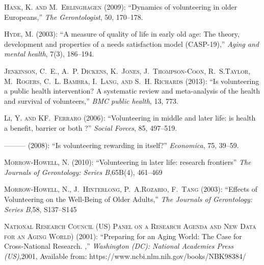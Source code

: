 \documentclass[10pt, letterpaper]{article}
\begin{document}
\begin{spacing}{1.4}
\begin{thebibliography}{87}
\textsc{Hank, K. and M.~Erlinghagen} (2009): \enquote{Dynamics of volunteering in older Europeans,} \emph{The Gerontologist}, 50, 170--178.  

\textsc{Hyde, M.} (2003): \enquote{A measure of quality of life in early old age: The theory, development and properties of a needs satisfaction model (CASP-19),} \emph{Aging and mental health}, 7(3), 186--194. 


\textsc{Jenkinson, C.~E., A.~P. Dickens, K.~Jones, J.~Thompson-Coon, R.~S.Taylor, M.~Rogers, C.~L. Bambra, I.~Lang, and S.~H. Richards} (2013):
  \enquote{Is volunteering a public health intervention? A systematic review and meta-analysis of the health and survival of volunteers,} \emph{BMC public health}, 13, 773.


\textsc{Li, Y. and KF.~Ferraro} (2006): \enquote{Volunteering in middle and later life: is health a benefit, barrier or both ?} \emph{Social Forces}, 85, 497--519. 


---\hspace{-.1pt}---\hspace{-.1pt}--- (2008{}): \enquote{Is volunteering rewarding in itself?} \emph{Economica}, 75, 39--59.

\textsc{Morrow-Howell, N.} (2010):
  \enquote{Volunteering in later life: research frontiers} \emph{The Journals of Gerontology: Series B},65B(4), 461–469


\textsc{Morrow-Howell, N., J.~Hinterlong, P.~A.Rozario, F.~Tang} (2003):
  \enquote{Effects of Volunteering on the Well-Being of Older Adults,} \emph{The Journals of Gerontology: Series B},58, S137--S145

\textsc{National Research Council (US) Panel on a Research Agenda and New Data for an Aging World)} (2001):
  \enquote{Preparing for an Aging World: The Case for Cross-National Research. ,} \emph{Washington (DC): National Academies Press (US)},2001, Available from: https://www.ncbi.nlm.nih.gov/books/NBK98384/



\end{thebibliography}
\end{spacing}
\end{document}
